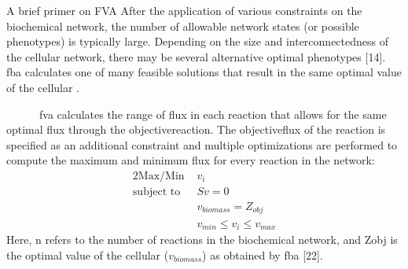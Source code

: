 \begin{pabox}[label=trends:box:fva]{A brief primer on FVA}
After the application of various constraints on the 
biochemical network, the number of allowable network 
states (or possible phenotypes) is typically large. 
Depending on the size and interconnectedness of the 
cellular network, there may be several alternative 
optimal phenotypes [14]. \gls{fba} calculates one of many 
feasible solutions that result in the same optimal 
value of the cellular .

~~~~~~\gls{fva} calculates the range of 
\gls{flux} in each reaction that allows for the same optimal 
\gls{flux} through the \gls{objectivereaction}. The \gls{objectiveflux} 
of the reaction is specified as an additional 
constraint and multiple optimizations are performed 
to compute the maximum and minimum flux for every reaction in the network:
\begin{alignat*}{2}
\text{Max/Min  }   & v_{i}  \\
\text{subject to  } & Sv=0 \\
                    & v_{biomass} = Z_{obj} \\
                    & v_{min} \leq v_i \leq v_{max}
\end{alignat*}
Here, n refers to the number of reactions in the 
biochemical network, and Zobj is the optimal value 
of the cellular  ($v_{biomass}$) as obtained by \gls{fba} [22].
\end{pabox}